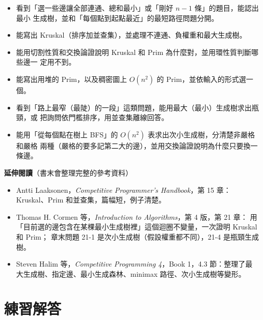 \begin{itemize}
\item 看到「選一些邊讓全部連通、總和最小」或「剛好 $n - 1$ 條」的題目，能認出最小
生成樹，並和「每個點到起點最近」的最短路徑問題分開。
\item 能寫出 Kruskal（排序加並查集），並處理不連通、負權重和最大生成樹。
\item 能用切割性質和交換論證說明 Kruskal 和 Prim 為什麼對，並用環性質判斷哪些邊一
定用不到。
\item 能寫出用堆的 Prim，以及稠密圖上 $O(n^2)$ 的 Prim，並依輸入的形式選一個。
\item 看到「路上最窄（最陡）的一段」這類問題，能用最大（最小）生成樹求出瓶頸，或
把詢問依門檻排序，用並查集離線回答。
\item 能用「從每個點在樹上 BFS」的 $O(n^2)$ 表求出次小生成樹，分清楚非嚴格和嚴格
兩種（嚴格的要多記第二大的邊），並用交換論證說明為什麼只要換一條邊。
\end{itemize}

\textbf{延伸閱讀}（書末會整理完整的參考資料）

\begin{itemize}
\item Antti Laaksonen，\textit{Competitive Programmer's Handbook}，第 15 章：
Kruskal、Prim 和並查集，篇幅短，例子清楚。
\item Thomas H. Cormen 等，\textit{Introduction to Algorithms}，第 4 版，第 21 章：
用「目前選的邊包含在某棵最小生成樹裡」這個迴圈不變量，一次證明 Kruskal 和 Prim；
章末問題 21-1 是次小生成樹（假設權重都不同），21-4 是瓶頸生成樹。
\item Steven Halim 等，\textit{Competitive Programming 4}，Book 1，4.3 節：整理了最
大生成樹、指定邊、最小生成森林、minimax 路徑、次小生成樹等變形。
\end{itemize}

\section*{練習解答}

